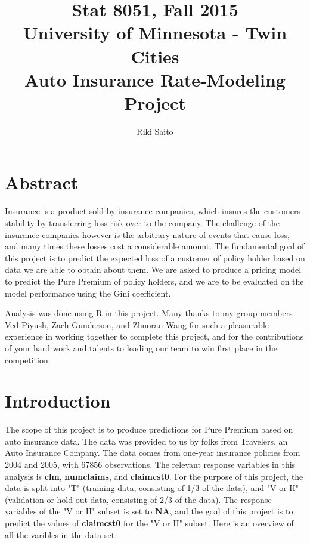 \documentclass[a4paper]{article}\usepackage[]{graphicx}\usepackage[]{color}
\begin{document}
\title{Stat 8051, Fall 2015 \\  University of Minnesota - Twin Cities \\
Auto Insurance Rate-Modeling Project}
\author{Riki Saito}

\maketitle
\thispagestyle{empty}
\newpage

\section*{Abstract}

Insurance is a product sold by insurance companies, which insures the customers stability by transferring loss risk over to the company. The challenge of the insurance companies however is the arbitrary nature of events that cause loss, and many times these losses cost a considerable amount. The fundamental goal of this project is to predict the expected loss of a customer of policy holder based on data we are able to obtain about them. We are asked to produce a pricing model to predict the Pure Premium of policy holders, and we are to be evaluated on the model performance using the Gini coefficient.

Analysis was done using R in this project. Many thanks to my group members Ved Piyush, Zach Gunderson, and Zhuoran Wang for such a pleasurable experience in working together to complete this project, and for the contributions of your hard work and talents to leading our team to win first place in the competition.

\section*{Introduction}

The scope of this project is to produce predictions for Pure Premium based on auto insurance data. The data was provided to us by folks from Travelers, an Auto Insurance Company.  The data comes from one-year insurance policies from 2004 and 2005, with 67856 observations. The relevant response variables in this analysis is \textbf{clm}, \textbf{numclaims}, and \textbf{claimcst0}. For the purpose of this project, the data is split into "T" (training data, consisting of 1/3 of the data), and "V or H" (validation or hold-out data, consisting of 2/3 of the data). The response variables of the "V or H" subset is set to \textbf{NA}, and the goal of this project is to predict the values of \textbf{claimcst0} for the "V or H" subset. Here is an overview of all the varibles in the data set.
\end{document}
